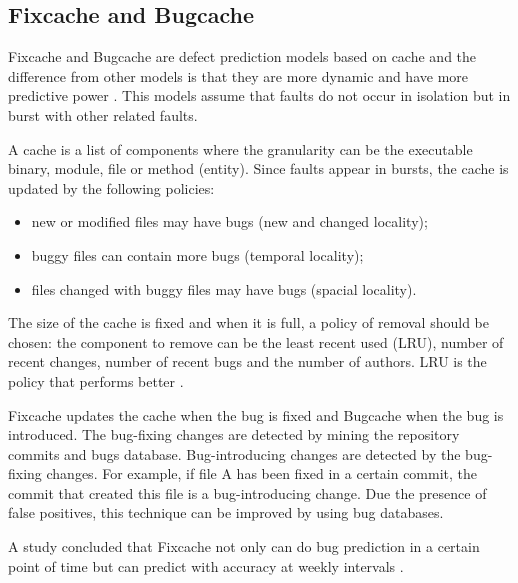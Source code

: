 \subsection{Fixcache and Bugcache}
Fixcache and Bugcache are defect prediction models based on cache and the difference from other models is that they are more dynamic and have more predictive power \cite{Kim:2007:PFC:1248820.1248881}. This models assume that faults do not occur in isolation but in burst with other related faults.

A cache is a list of components where the granularity can be the executable binary, module, file or method (entity). Since faults appear in bursts, the cache is updated by the following policies:
\begin{itemize}
  \item new or modified files may have bugs (new and changed locality);
  \item buggy files can contain more bugs (temporal locality);
  \item files changed with buggy files may have bugs (spacial locality).
\end{itemize}

The size of the cache is fixed and when it is full, a policy of removal should be chosen: the component to remove can be the least recent used (LRU), number of recent changes, number of recent bugs and the number of authors. LRU is the policy that performs better \cite{Sadowski2011}.

Fixcache updates the cache when the bug is fixed and Bugcache when the bug is introduced. The bug-fixing changes are detected by mining the repository commits and bugs database. Bug-introducing changes are detected by the bug-fixing changes. For example, if file A has been fixed in a certain commit, the commit that created this file is a bug-introducing change. Due the presence of false positives, this technique can be improved by using bug databases.

A study concluded that Fixcache not only can do bug prediction in a certain point of time but can predict with accuracy at weekly intervals \cite{Sadowski2011}.

